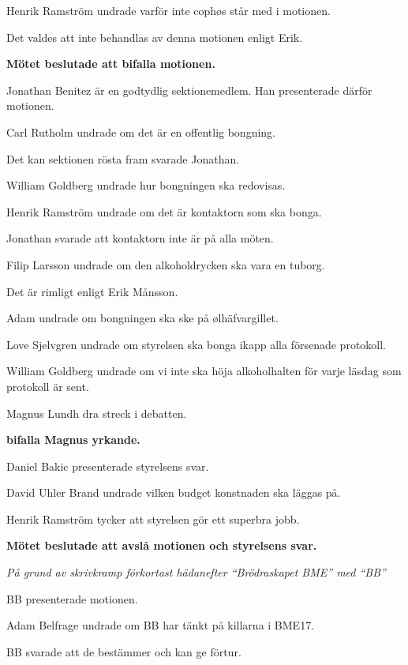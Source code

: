 \documentclass[10pt]{article}
\begin{document}
\begin{paragrafer}
\begin{paragrafer}
		Henrik Ramström undrade varför inte cophøs står med i motionen.
		
		Det valdes att inte behandlas av denna motionen enligt Erik.

		\textbf{Mötet beslutade att bifalla motionen.}


		Jonathan Benitez är en godtydlig sektionemedlem. Han presenterade därför motionen.

		Carl Rutholm undrade om det är en offentlig bongning.

		Det kan sektionen rösta fram svarade Jonathan.
		
		William Goldberg undrade hur bongningen ska redovisas. 

		Henrik Ramström undrade om det är kontaktorn som ska bonga.

		Jonathan svarade att kontaktorn inte är på alla möten.

		Filip Larsson undrade om den alkoholdrycken ska vara en tuborg. 

		Det är rimligt enligt Erik Månsson.

		Adam undrade om bongningen ska ske på ølhäfvargillet. 

		Love Sjelvgren undrade om styrelsen ska bonga ikapp alla försenade protokoll.

		William Goldberg undrade om vi inte ska höja alkoholhalten för varje läsdag som protokoll är sent.
		
		Magnus Lundh \ypa dra streck i debatten.

		\textbf{\Mba bifalla Magnus yrkande.}

		Daniel Bakic presenterade styrelsens svar. 

		David Uhler Brand undrade vilken budget konstnaden ska läggas på. 

		Henrik Ramström tycker att styrelsen gör ett superbra jobb. 

		\textbf{Mötet beslutade att avslå motionen och styrelsens svar.}

		\newpage


		\emph{På grund av skrivkramp förkortast hädanefter ``Brödraskapet BME'' med ``BB''}

		BB presenterade motionen. 

		Adam Belfrage undrade om BB har tänkt på killarna i BME17. 

		BB svarade att de bestämmer och kan ge förtur.


\end{paragrafer}
\end{paragrafer}
\end{document}
